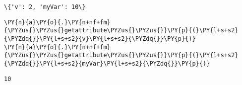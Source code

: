 \begin{tcolorbox}[breakable, size=fbox, boxrule=.5pt, pad at break*=1mm, opacityfill=0]
\begin{Verbatim}[commandchars=\\\{\}]
\{'v': 2, 'myVar': 10\}
\end{Verbatim}
\end{tcolorbox}
        
\begin{tcolorbox}[breakable, size=fbox, boxrule=1pt, pad at break*=1mm,colback=cellbackground, colframe=cellborder]
\begin{Verbatim}[commandchars=\\\{\}]
\PY{n}{a}\PY{o}{.}\PY{n+nf+fm}{\PYZus{}\PYZus{}getattribute\PYZus{}\PYZus{}}\PY{p}{(}\PY{l+s+s2}{\PYZdq{}}\PY{l+s+s2}{v}\PY{l+s+s2}{\PYZdq{}}\PY{p}{)}
\PY{n}{a}\PY{o}{.}\PY{n+nf+fm}{\PYZus{}\PYZus{}getattribute\PYZus{}\PYZus{}}\PY{p}{(}\PY{l+s+s2}{\PYZdq{}}\PY{l+s+s2}{myVar}\PY{l+s+s2}{\PYZdq{}}\PY{p}{)}
\end{Verbatim}
\end{tcolorbox}

\begin{tcolorbox}[breakable, size=fbox, boxrule=.5pt, pad at break*=1mm, opacityfill=0]
\begin{Verbatim}[commandchars=\\\{\}]
10
\end{Verbatim}
\end{tcolorbox}
        

